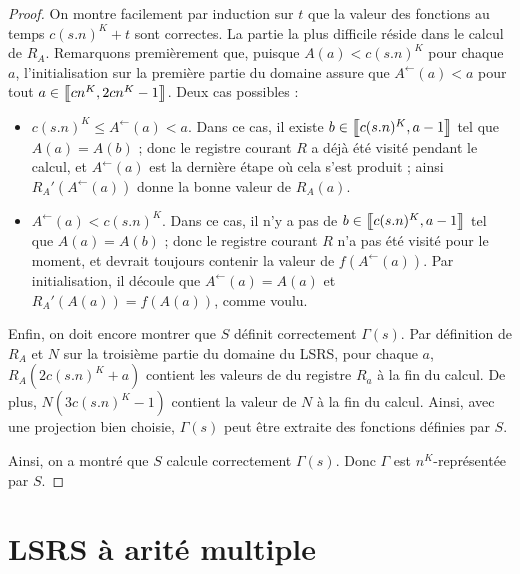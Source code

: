 \documentclass{report}
\begin{document}
\begin{proof}
			On montre facilement par induction sur $t$ que la valeur des fonctions au temps $c(s.n)^K+t$ sont correctes. La partie la plus difficile réside dans le calcul de $R_A$. Remarquons premièrement que, puisque $A(a) < c(s.n)^K$ pour chaque $a$, l'initialisation sur la première partie du domaine assure que $A^{\leftarrow}(a) < a$ pour tout $a \in \left[\!\!\>\!\left[ cn^K , 2cn^K-1 \right]\!\!\>\!\right]$. Deux cas possibles :
			
			\begin{itemize}[itemsep=-1mm]
				\item 	
					$c(s.n)^K \leqslant A^{\leftarrow}(a) < a$. Dans ce cas, il existe $b \in \left[\!\!\>\!\left[ c(s.n)^K , a-1 \right]\!\!\>\!\right]$ tel que $A(a) = A(b)$ ; donc le registre courant $R$ a déjà été visité pendant le calcul, et $A^{\leftarrow}(a)$ est la dernière étape où cela s'est produit ; ainsi $R_A'\left(A^{\leftarrow}(a)\right)$ donne la bonne valeur de $R_A(a)$.
					
				\item 
					$A^{\leftarrow}(a) < c(s.n)^K$. Dans ce cas, il n'y a pas de $b \in \left[\!\!\>\!\left[ c(s.n)^K , a-1 \right]\!\!\>\!\right]$ tel que $A(a) = A(b)$ ; donc le registre courant $R$ n'a pas été visité pour le moment, et devrait toujours contenir la valeur de $f(A^{\leftarrow}(a))$\footnotemark. Par initialisation, il découle que $A^{\leftarrow}(a) = A(a)$ et $R_A'(A(a)) = f(A(a))$, comme voulu.
					
			\end{itemize}
			
			Enfin, on doit encore montrer que $S$ définit correctement $\Gamma(s)$. Par définition de $R_A$ et $N$ sur la troisième partie du domaine du LSRS, pour chaque $a$, $R_A\left( 2 c(s.n)^K + a \right)$ contient les valeurs de du registre $R_a$ à la fin du calcul. De plus, $N(3c(s.n)^K-1)$ contient la valeur de $N$ à la fin du calcul. Ainsi, avec une projection bien choisie, $\Gamma(s)$ peut être extraite des fonctions définies par $S$. 
			
			Ainsi, on a montré que $S$ calcule correctement $\Gamma(s)$. Donc $\Gamma$ est $n^K$-représentée par $S$.
			
		\end{proof}

		
		
		
		
	\pagebreak
	 
	\pagebreak
		
	\chapter{LSRS à arité multiple}
	\label{chap:rLSRS}
	
\end{document}
